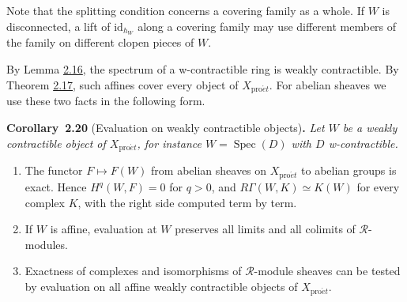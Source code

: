 \documentclass[11pt]{article}
\newenvironment{bpstatement}[2]{\par\addvspace{0.6\baselineskip}\noindent\textbf{#1}#2\textbf{.}\enspace\ignorespaces}
  {\par\addvspace{0.4\baselineskip}}
\newenvironment{bpstatementit}[2]{\begin{bpstatement}{#1}{#2}\itshape\ignorespaces}{\end{bpstatement}}
\begin{document}
\label{bp56}%
Note that the splitting condition concerns a covering family as a whole. If \(W\) is disconnected, a lift of \(\mathrm{id}_{h_W}\) along a covering family may use different members of the family on different clopen pieces of \(W\).

By Lemma \hyperref[bp47]{2.16}, the spectrum of a w-contractible ring is weakly contractible. By Theorem \hyperref[bp49]{2.17}, such affines cover every object of \(X_{\mathrm{pro}\acute{e}t}\). For abelian sheaves we use these two facts in the following form.

\label{bp57}%
\begin{bpstatementit}{Corollary~2.20}{ (Evaluation on weakly contractible objects)}
Let \(W\) be a weakly contractible object of \(X_{\mathrm{pro}\acute{e}t}\), for instance \(W=\operatorname{Spec}(D)\) with \(D\) w-contractible.

\begin{enumerate}
\item The functor \(F\mapsto F(W)\) from abelian sheaves on \(X_{\mathrm{pro}\acute{e}t}\) to abelian groups is exact. Hence \(H^q(W,F)=0\) for \(q>0\), and \(R\Gamma(W,K)\simeq K(W)\) for every complex \(K\), with the right side computed term by term.
\item If \(W\) is affine, evaluation at \(W\) preserves all limits and all colimits of \(\mathcal R\)-modules.
\item Exactness of complexes and isomorphisms of \(\mathcal R\)-module sheaves can be tested by evaluation on all affine weakly contractible objects of \(X_{\mathrm{pro}\acute{e}t}\).
\end{enumerate}
\end{bpstatementit}
\end{document}
